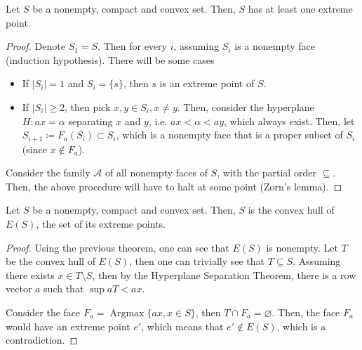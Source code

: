 \begin{theorem}
  Let \( S \) be a nonempty, compact and convex set. Then, \( S \) has at least
  one extreme point.
\end{theorem}

\begin{proof}
Denote \( S_{1} = S \). Then for every \( i \), assuming \( S_{i} \) is a
nonempty face (induction hypothesis). There will be some cases
\begin{itemize}
  \item If \( |S_{i}| = 1 \) and \( S_{i} = \{ s\}   \), then \( s \) is an
    extreme point of \( S \).
  \item If \( |S_{i}| \ge  2 \), then pick \( x, y \in S_{i}, x \neq y \). Then,
    consider the hyperplane \( H: ax = \alpha \) separating \( x \) and \( y \),
    i.e. \( ax < \alpha < ay \), which always exist. Then, let \( S_{i+1}
    \coloneqq F_{a}(S_{i}) \subset S_{i} \), which is a nonempty face that is a
    proper subset of \( S_{i} \) (since \( x \notin F_{a} \)).
\end{itemize}

Consider the family \( \mathcal{A} \) of all nonempty faces of \( S \), with the partial
order \( \subseteq \). Then, the above procedure will have to halt at some
point (Zorn's lemma).
\end{proof}

\begin{theorem}
  Let \( S \) be a nonempty, compact and convex set. Then, \( S \) is the convex
  hull of \( E(S) \), the set of its extreme points.
\end{theorem}

\begin{proof}
  Using the previous theorem, one can see that \( E(S) \) is nonempty.
  Let \( T \) be the convex hull of \( E(S) \), then one can trivially
  see that \( T \subseteq S \). Assuming there exists \( x \in T \setminus S \),
  then by the Hyperplane Separation Theorem, there is a row vector \( a \) such
  that \( \sup aT < ax \).

  Consider the face \( F_{a} = \operatorname{Argmax} \{ ax, x \in S \}   \),
  then \( T \cap  F_{a} = \varnothing \). Then, the face \( F_{a} \) would have
  an extreme point \( e' \), which means that \( e'  \notin E(S)\), which is a
  contradiction.
\end{proof}


